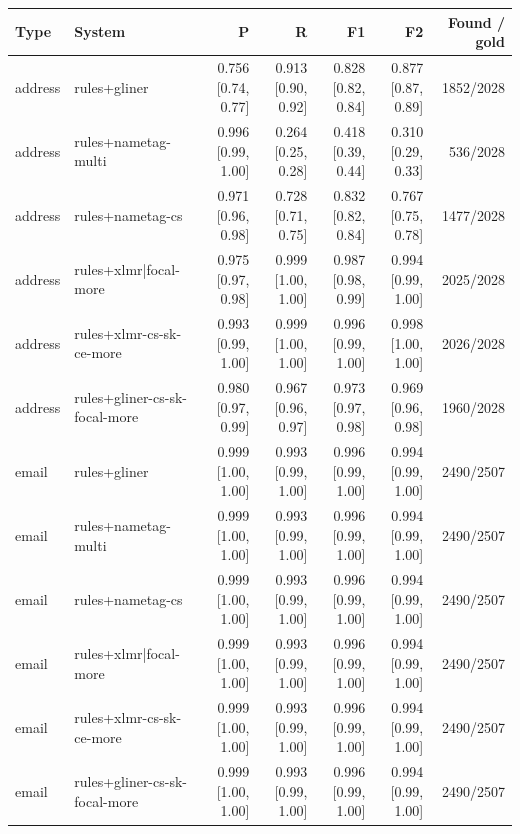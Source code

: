 \providecommand{\ci}[2]{{\scriptsize [#1, #2]}}

\begin{table}[htbp]
\centering
\small
\begin{tabular}{llrrrrr}
\toprule
Type & System & P & R & F1 & F2 & Found / gold \\
\midrule
address & rules+gliner & 0.756 \ci{0.74}{0.77} & 0.913 \ci{0.90}{0.92} & 0.828 \ci{0.82}{0.84} & 0.877 \ci{0.87}{0.89} & 1852/2028 \\
address & rules+nametag-multi & 0.996 \ci{0.99}{1.00} & 0.264 \ci{0.25}{0.28} & 0.418 \ci{0.39}{0.44} & 0.310 \ci{0.29}{0.33} & 536/2028 \\
address & rules+nametag-cs & 0.971 \ci{0.96}{0.98} & 0.728 \ci{0.71}{0.75} & 0.832 \ci{0.82}{0.84} & 0.767 \ci{0.75}{0.78} & 1477/2028 \\
address & rules+xlmr|focal-more & 0.975 \ci{0.97}{0.98} & 0.999 \ci{1.00}{1.00} & 0.987 \ci{0.98}{0.99} & 0.994 \ci{0.99}{1.00} & 2025/2028 \\
address & rules+xlmr-cs-sk-ce-more & 0.993 \ci{0.99}{1.00} & 0.999 \ci{1.00}{1.00} & 0.996 \ci{0.99}{1.00} & 0.998 \ci{1.00}{1.00} & 2026/2028 \\
address & rules+gliner-cs-sk-focal-more & 0.980 \ci{0.97}{0.99} & 0.967 \ci{0.96}{0.97} & 0.973 \ci{0.97}{0.98} & 0.969 \ci{0.96}{0.98} & 1960/2028 \\
email & rules+gliner & 0.999 \ci{1.00}{1.00} & 0.993 \ci{0.99}{1.00} & 0.996 \ci{0.99}{1.00} & 0.994 \ci{0.99}{1.00} & 2490/2507 \\
email & rules+nametag-multi & 0.999 \ci{1.00}{1.00} & 0.993 \ci{0.99}{1.00} & 0.996 \ci{0.99}{1.00} & 0.994 \ci{0.99}{1.00} & 2490/2507 \\
email & rules+nametag-cs & 0.999 \ci{1.00}{1.00} & 0.993 \ci{0.99}{1.00} & 0.996 \ci{0.99}{1.00} & 0.994 \ci{0.99}{1.00} & 2490/2507 \\
email & rules+xlmr|focal-more & 0.999 \ci{1.00}{1.00} & 0.993 \ci{0.99}{1.00} & 0.996 \ci{0.99}{1.00} & 0.994 \ci{0.99}{1.00} & 2490/2507 \\
email & rules+xlmr-cs-sk-ce-more & 0.999 \ci{1.00}{1.00} & 0.993 \ci{0.99}{1.00} & 0.996 \ci{0.99}{1.00} & 0.994 \ci{0.99}{1.00} & 2490/2507 \\
email & rules+gliner-cs-sk-focal-more & 0.999 \ci{1.00}{1.00} & 0.993 \ci{0.99}{1.00} & 0.996 \ci{0.99}{1.00} & 0.994 \ci{0.99}{1.00} & 2490/2507 \\

\end{tabular}
\end{table}
